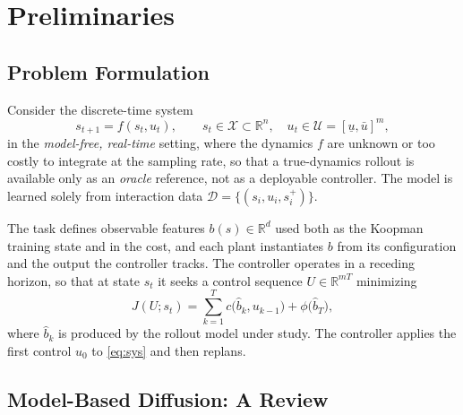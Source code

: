 \documentclass[letterpaper,10pt,conference]{ieeeconf}
\begin{document}
\section{Preliminaries}\label{sec:prelim}

\subsection{Problem Formulation}\label{subsec:problem}

Consider the discrete-time system
\begin{equation}
s_{t+1} = f(s_t, u_t), \qquad
s_t \in \mathcal{X} \subset \mathbb{R}^{n},\quad
u_t \in \mathcal{U} = [\underline{u}, \bar{u}]^{m},
\label{eq:sys}
\end{equation}
in the \emph{model-free, real-time} setting, where the dynamics $f$ are unknown or too costly to integrate at the sampling rate, so that a true-dynamics rollout is available only as an \emph{oracle} reference, not as a deployable controller.
The model is learned solely from interaction data $\mathcal{D} = \{(s_i, u_i, s_i^{+})\}$.

The task defines observable features $b(s) \in \mathbb{R}^{d}$ used both as the Koopman training state and in the cost, and each plant instantiates $b$ from its configuration and the output the controller tracks.
The controller operates in a receding horizon, so that at state $s_t$ it seeks a control sequence $U \in \mathbb{R}^{mT}$ minimizing
\begin{equation}
J(U; s_t) = \sum_{k=1}^{T} c\big(\hat{b}_k, u_{k-1}\big)
+ \phi\big(\hat{b}_T\big),
\label{eq:cost}
\end{equation}
where $\hat b_k$ is produced by the rollout model under study. The controller applies the first control $u_0$ to \eqref{eq:sys} and then replans.

\subsection{Model-Based Diffusion: A Review}\label{subsec:mbd}
\end{document}
